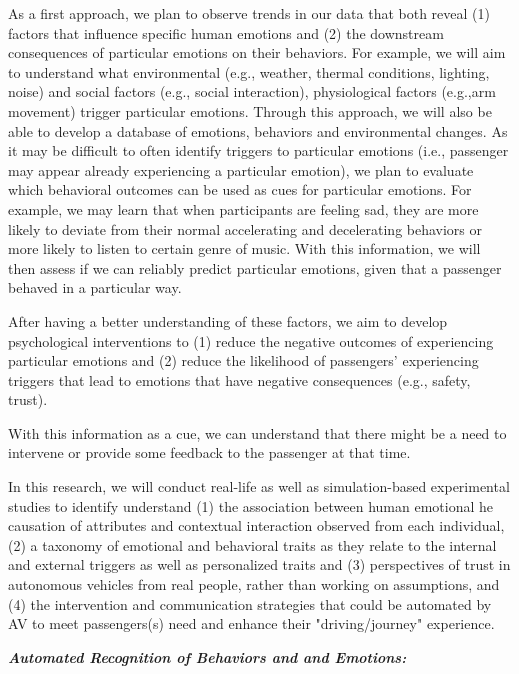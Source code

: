 As a first approach, we plan to observe trends in our data that both reveal (1) factors that influence specific human emotions and (2) the downstream consequences of particular emotions on their behaviors. For example, we will aim to understand what environmental (e.g., weather, thermal conditions, lighting, noise) and social factors (e.g., social interaction), physiological factors (e.g.,arm movement) trigger particular emotions. Through this approach, we will also be able to develop a database of  emotions, behaviors and environmental changes. %
As it may be difficult to often identify triggers to particular emotions (i.e., passenger may appear already experiencing a particular emotion), we plan to evaluate which behavioral outcomes can be used as cues for particular emotions. For example, we may learn that when participants are feeling sad, they are more likely to deviate from their normal accelerating and decelerating behaviors or more likely to listen to certain genre of music. With this information, we will then assess if we can reliably predict particular emotions, given that a passenger behaved in a particular way. 

After having a better understanding of these factors, we aim to develop psychological interventions to (1) reduce the negative outcomes of experiencing particular emotions  and (2) reduce the likelihood of passengers’ experiencing triggers that lead to emotions that have negative consequences (e.g., safety, trust). 


With this information as a cue, we can understand that there might be a need to intervene or provide some feedback to the passenger at that time. 


In this research, we will conduct real-life as well as simulation-based experimental studies to identify understand (1) the association between human emotional he causation of attributes and contextual interaction observed from each individual, (2) a taxonomy of emotional and behavioral traits as they relate to the internal and external triggers as well as personalized traits and (3) perspectives of trust in autonomous vehicles from real people, rather than working on assumptions, and (4) the intervention and communication strategies that could be automated by AV to meet passengers(s) need and enhance their "driving/journey" experience.

\noindent\textbf{\em Automated Recognition of Behaviors and and Emotions:} \vskip 0.2in


